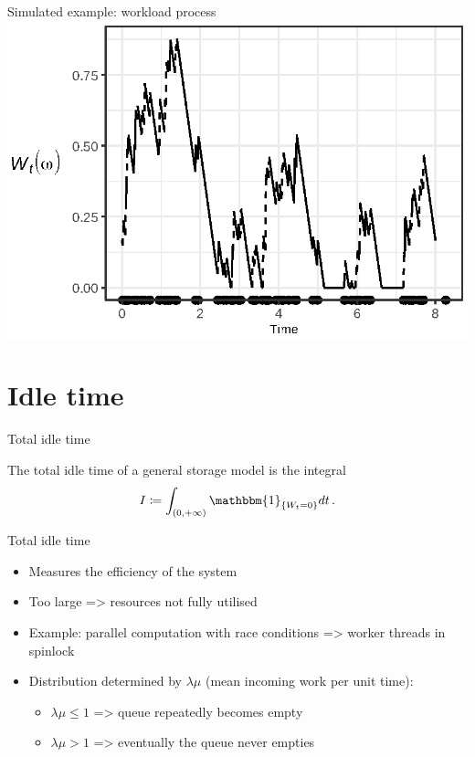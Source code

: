 \documentclass{beamer}
\begin{document}
\begin{frame}{Simulated example: workload process}
  \includegraphics{workload_prsnt}
\end{frame}

\section{Idle time}

\begin{frame}{Total idle time}
  \begin{definition}
    The total idle time of a general storage model is the integral
    \begin{equation}
      I \coloneqq \int_{(0, +\infty)} \mathbbm{1}_{\{ W_t = 0 \}} dt \,.
    \end{equation}
  \end{definition}
\end{frame}

\begin{frame}{Total idle time}
  \begin{itemize}
    \item Measures the efficiency of the system
    \item Too large => resources not fully utilised
    \item Example: parallel computation with race conditions => worker threads in spinlock
    \item Distribution determined by $\lambda \mu$ (mean incoming work per unit time):
    \begin{itemize}
      \item $\lambda \mu \leq 1$ => queue repeatedly becomes empty
      \item $\lambda \mu > 1$ => eventually the queue never empties
    \end{itemize}
  \end{itemize}
\end{frame}
\end{document}

